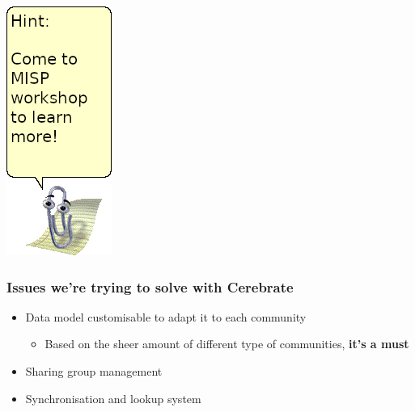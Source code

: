 \begin{frame}
\begin{minipage}{0.19\textwidth}
        \includegraphics[width=0.8\linewidth]{pictures/clippy-hint.png}
    \end{minipage}
\end{frame}

\begin{frame}
\frametitle{Issues we're trying to solve with Cerebrate}
    \begin{itemize}
        \item Data model customisable to adapt it to each community
        \begin{itemize}
            \item Based on the sheer amount of different type of communities, \textbf{it's a must}
        \end{itemize}
        \item Sharing group management
        \item Synchronisation and lookup system
    \end{itemize}
\end{frame}

